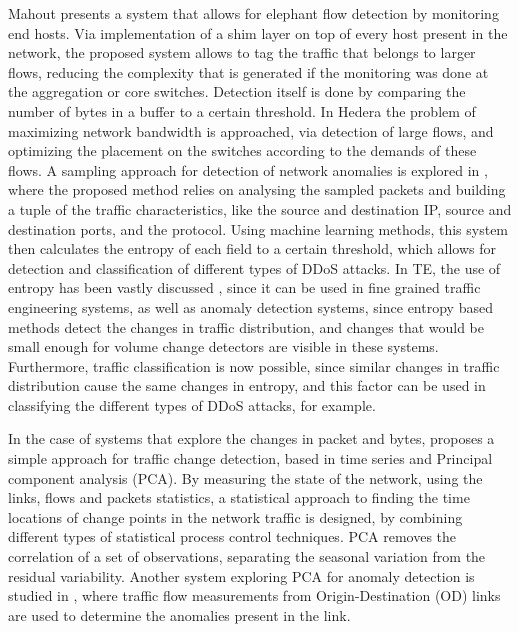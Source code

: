 \par Mahout \cite{curtis_mahout:_2011} presents a system that allows for elephant flow detection by monitoring end hosts. Via implementation of a shim layer on top
of every host present in the network, the proposed system allows to tag the traffic that belongs to larger flows, reducing the complexity that is generated 
if the monitoring was done at the aggregation or core switches. Detection itself is done by comparing the number of bytes in a buffer to a certain threshold.
In Hedera \cite{al-fares_hedera:_2010} the problem of maximizing network bandwidth is approached, via detection of large flows, and optimizing the placement on the 
switches according to the demands of these flows. A sampling approach for detection of network anomalies is explored in \cite{jun_ddos_2014}, where the 
proposed method relies on analysing the sampled packets and building a tuple of the traffic characteristics, like the source and destination IP, source and 
destination ports, and the protocol. Using machine learning methods, this system then calculates the entropy of each field to a certain threshold, which
allows for detection and classification of different types of DDoS attacks. In TE, the use of entropy has been vastly discussed \cite{brauckhoff_impact_2006,
lall_data_2006}, since it can be used in fine grained traffic engineering systems, as well as anomaly detection systems, since entropy based methods
detect the changes in traffic distribution, and changes that would be small enough for volume change detectors are visible in these systems. Furthermore, traffic
classification is now possible, since similar changes in traffic distribution cause the same changes in entropy, and this factor can be used in classifying the 
different types of DDoS attacks, for example.

\par In the case of systems that explore the changes in packet and bytes, \cite{munz_traffic_2010} proposes a simple approach for traffic change detection, based in
time series and Principal component analysis (PCA). By measuring the state of the network, using the links, flows and packets statistics, a statistical approach to 
finding the time locations of change points in the network traffic is designed, by combining different types of statistical process control techniques.
PCA removes the correlation of a set of observations, separating the seasonal variation from the residual variability. Another system exploring PCA for anomaly
detection is studied in \cite{lakhina_characterization_2004}, where traffic flow measurements from Origin-Destination (OD) links are used to determine the anomalies
present in the link. 

